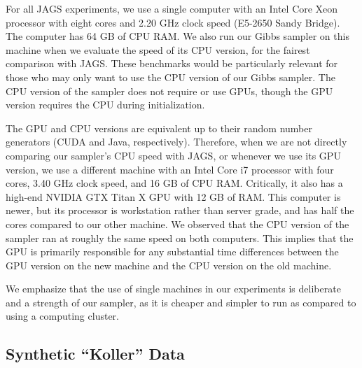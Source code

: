\documentclass{article} %
\begin{document}
For all JAGS experiments, we use a single computer with an Intel Core Xeon processor with eight
cores and 2.20 GHz clock speed (E5-2650 Sandy Bridge). The computer has 64 GB of CPU RAM. We also
run our Gibbs sampler on this machine when we evaluate the speed of its CPU version, for the fairest
comparison with JAGS. These benchmarks would be particularly relevant for those who may only want to
use the CPU version of our Gibbs sampler. The CPU version of the sampler does not require or use
GPUs, though the GPU version requires the CPU during initialization.

The GPU and CPU versions are equivalent up to their random number generators (CUDA and Java,
respectively). Therefore, when we are not directly comparing our sampler's CPU speed with JAGS, or
whenever we use its GPU version, we use a different machine with an Intel Core i7 processor with
four cores, 3.40 GHz clock speed, and 16 GB of CPU RAM. Critically, it also has a high-end NVIDIA
GTX Titan X GPU with 12 GB of RAM.  This computer is newer, but its processor is workstation rather
than server grade, and has half the cores compared to our other machine. We observed that the CPU
version of the sampler ran at roughly the same speed on both computers. This implies that the GPU is
primarily responsible for any substantial time differences between the GPU version on the new
machine and the CPU version on the old machine.

We emphasize that the use of single machines in our experiments is deliberate and a strength of our
sampler, as it is cheaper and simpler to run as compared to using a computing cluster.

\subsection{Synthetic ``Koller'' Data}\label{ssec:koller_data}
\end{document}

